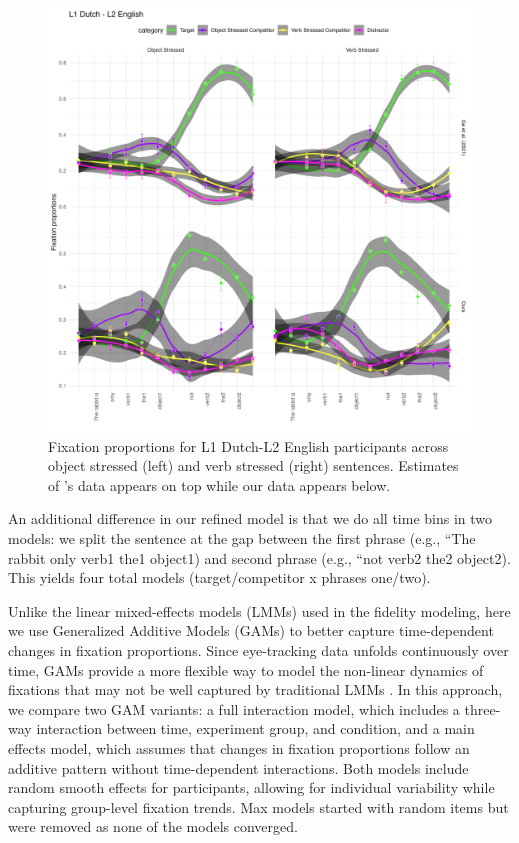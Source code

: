 \begin{figure}[H]  %
    \centering
    \includegraphics[width=\textwidth,height=\textheight,keepaspectratio]{viz/dutch_fix2.png}
    \caption{Fixation proportions for L1 Dutch-L2 English participants across object stressed (left) and verb stressed (right) sentences. Estimates of \cite{ge2021a}'s data appears on top while our data appears below.}
    \label{fig:dutch_fix2}
\end{figure}

An additional difference in our refined model is that we do all time bins in two models: we split the sentence at the gap between the first phrase (e.g., ``The rabbit only verb1 the1 object1) and second phrase (e.g., ``not verb2 the2 object2). This yields four total models (target/competitor x phrases one/two). 

Unlike the linear mixed-effects models (LMMs) used in the fidelity modeling, here we use Generalized Additive Models (GAMs) to better capture time-dependent changes in fixation proportions. Since eye-tracking data unfolds continuously over time, GAMs provide a more flexible way to model the non-linear dynamics of fixations that may not be well captured by traditional LMMs \parencite{Wood2017}. In this approach, we compare two GAM variants: a full interaction model, which includes a three-way interaction between time, experiment group, and condition, and a main effects model, which assumes that changes in fixation proportions follow an additive pattern without time-dependent interactions. Both models include random smooth effects for participants, allowing for individual variability while capturing group-level fixation trends. Max models started with random items but were removed as none of the models converged.

